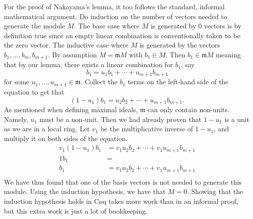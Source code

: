 \documentclass{article}
\begin{document}
For the proof of Nakayama's lemma, it too follows the standard, informal
mathematical argument. Do induction on the number of vectors needed to generate
the module \(M\). The base case where \(M\) is generated by 0 vectors is by
definition true since an empty linear combination is conventionally taken to be
the zero vector. The inductive case where \(M\) is generated by the vectors
\(b_{1}, \dots, b_{m}, b_{m+1}\). By assumption \(M = \mathfrak{m} M\) with
\(b_{1}\in M\). Then \(b_{1}\in\mathfrak{m} M\) meaning that by our lemma,
there exists a linear combination for \(b_{1}\), say
\[b_{1} = u_{1} b_{1} + \cdots + u_{m+1} b_{m+1}\]
for some \(u_{1}, \dots, u_{m+1}\in\mathfrak{m}\). Collect the \(b_{1}\) terms
on the left-hand side of the equation to get that
\[(1 - u_{1}) b_{1} = u_{2} b_{2} + \cdots + u_{m+1} b_{m+1}\text{.}\]
As mentioned when defining maximal ideals, \(\mathfrak{m}\) can only contain
non-units. Namely, \(u_{1}\) must be a non-unit. Then we had already proven
that \(1 - u_{1}\) is a unit as we are in a local ring. Let \(v_{1}\) be the
multiplicative inverse of \(1 - u_{1}\), and multiply it on both sides of the
equation.
\begin{align*}
  v_{1} (1 - u_{1}) b_{1}
    & = v_{1} u_{2} b_{2} + \cdots + v_{1} u_{m+1} b_{m+1} \\
  1 b_{1} & = \\
  b_{1} & = v_{1} u_{2} b_{2} + \cdots + v_{1} u_{m+1} b_{m+1} \\
\end{align*}
We have thus found that one of the basis vectors is not needed to generate this
module. Using the induction hypothesis, we have that \(M = 0\). Showing that
the induction hypothesis holds in Coq takes more work than in an informal
proof, but this extra work is just a lot of bookkeeping.







\end{document}
